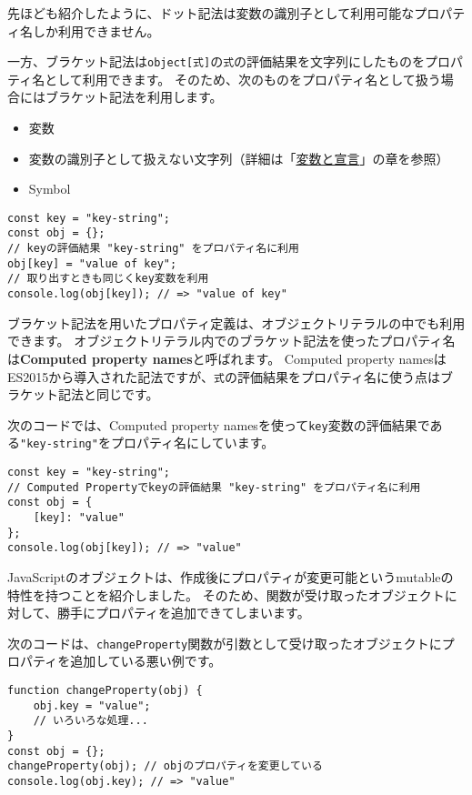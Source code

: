 先ほども紹介したように、ドット記法は変数の識別子として利用可能なプロパティ名しか利用できません。

一方、ブラケット記法は\texttt{object[式]}の\texttt{式}の評価結果を文字列にしたものをプロパティ名として利用できます。
そのため、次のものをプロパティ名として扱う場合にはブラケット記法を利用します。

\begin{itemize}
\item
  変数
\item
  変数の識別子として扱えない文字列（詳細は「\hyperlink{variable-and-declaration}{変数と宣言}」の章を参照）
\item
  Symbol
\end{itemize}

\begin{lstlisting}
const key = "key-string";
const obj = {};
// keyの評価結果 "key-string" をプロパティ名に利用
obj[key] = "value of key";
// 取り出すときも同じくkey変数を利用
console.log(obj[key]); // => "value of key"
\end{lstlisting}

ブラケット記法を用いたプロパティ定義は、オブジェクトリテラルの中でも利用できます。
オブジェクトリテラル内でのブラケット記法を使ったプロパティ名は\textbf{Computed
property names}と呼ばれます。 Computed property
namesはES2015から導入された記法ですが、\texttt{式}の評価結果をプロパティ名に使う点はブラケット記法と同じです。

次のコードでは、Computed property
namesを使って\texttt{key}変数の評価結果である\texttt{"key-string"}をプロパティ名にしています。

\begin{lstlisting}
const key = "key-string";
// Computed Propertyでkeyの評価結果 "key-string" をプロパティ名に利用
const obj = {
    [key]: "value"
};
console.log(obj[key]); // => "value"
\end{lstlisting}

JavaScriptのオブジェクトは、作成後にプロパティが変更可能というmutableの特性を持つことを紹介しました。
そのため、関数が受け取ったオブジェクトに対して、勝手にプロパティを追加できてしまいます。

次のコードは、\texttt{changeProperty}関数が引数として受け取ったオブジェクトにプロパティを追加している悪い例です。

\begin{lstlisting}
function changeProperty(obj) {
    obj.key = "value";
    // いろいろな処理...
}
const obj = {};
changeProperty(obj); // objのプロパティを変更している
console.log(obj.key); // => "value"
\end{lstlisting}

